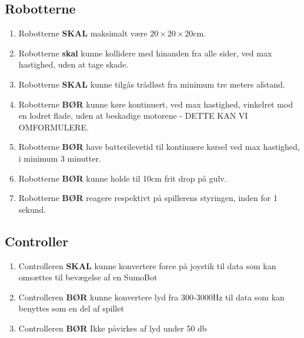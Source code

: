 \subsection{Robotterne}
\begin{enumerate}
    \item Robotterne \textbf{SKAL} maksimalt være $20 \times 20 \times 20$cm.
    \item Robotterne \textbf{skal} kunne kollidere med hinanden fra alle sider, ved max hastighed, uden at tage skade.
    \item Robotterne \textbf{SKAL} kunne tilgås trådløst fra minimum tre meters afstand.
    \item Robotterne \textbf {BØR} kunne køre kontinuert, ved max hastighed, vinkelret mod en lodret flade, uden at beskadige motorene - DETTE KAN VI OMFORMULERE.
    \item Robotterne \textbf{BØR} have batterilevetid til kontinuere kørsel ved max hastighed, i minimum 3 minutter.
    \item Robotterne \textbf{BØR} kunne holde til 10cm frit drop på gulv.
    \item Robotterne \textbf{BØR} reagere respektivt på spillerens styringen, inden for 1 sekund.
\end{enumerate}

\subsection{Controller}
\begin{enumerate}
    \item Controlleren \textbf{SKAL} kunne konvertere force på joystik til data som kan omsættes til bevægelse af en SumoBot
    \item Controlleren \textbf{BØR} kunne konvertere lyd fra 300-3000Hz til data som kan benyttes som en del af spillet
    \item Controlleren \textbf{BØR} Ikke påvirkes af lyd under 50 db
    
\end{enumerate}